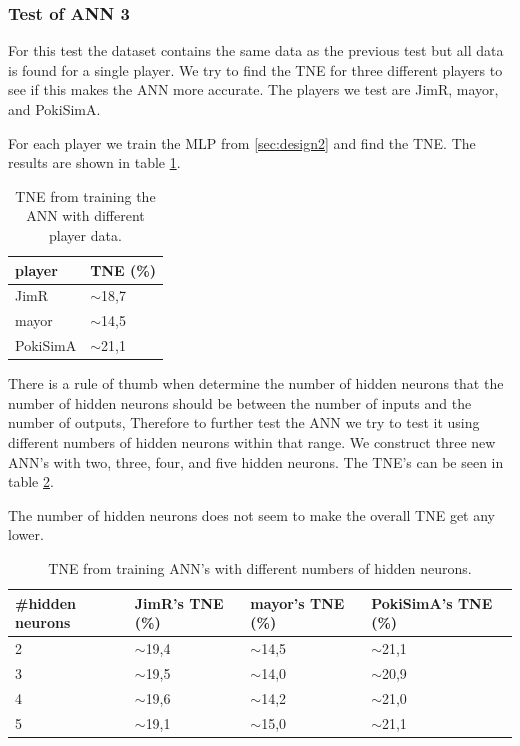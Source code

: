 \subsubsection{Test of ANN 3}
\label{sec:ann-test3}
For this test the dataset contains the same data as the previous test but all data is found for a single player. We try to find the TNE for three different players to see if this makes the ANN more accurate. The players we test are JimR, mayor, and PokiSimA.

For each player we train the MLP from \ref{sec:design2} and find the TNE. The results are shown in table \ref{tab:tneg3}.

\vspace{4mm}
\begin{table}[H]
\center
\begin{tabular}{ | l | l |}
  \hline
  player & TNE (\%) \\
  \hline
  JimR & $\sim$18,7 \\
  mayor & $\sim$14,5 \\
  PokiSimA & $\sim$21,1 \\
  \hline
\end{tabular}
\caption{TNE from training the ANN with different player data.\label{tab:tneg3}}
\end{table}
\vspace{4mm}

There is a rule of thumb when determine the number of hidden neurons that the number of hidden neurons should be between the number of inputs and the number of outputs,
Therefore to further test the ANN we try to test it using different numbers of hidden neurons within that range. We construct three new ANN's with two, three, four, and five hidden neurons. The TNE's can be seen in table \ref{tab:tneg4}. 

The number of hidden neurons does not seem to make the overall TNE get any lower.

\vspace{4mm}
\begin{table}[H]
\center
\begin{tabular}{ | l | l | l | l | }
  \hline
  \#hidden neurons & JimR's TNE (\%) & mayor's TNE (\%) & PokiSimA's TNE (\%) \\
  \hline
  2 & $\sim$19,4 & $\sim$14,5 & $\sim$21,1 \\
  3 & $\sim$19,5 & $\sim$14,0 & $\sim$20,9 \\
  4 & $\sim$19,6 & $\sim$14,2 & $\sim$21,0 \\
  5 & $\sim$19,1 & $\sim$15,0 & $\sim$21,1 \\
  \hline
\end{tabular}
\caption{TNE from training ANN's with different numbers of hidden neurons.\label{tab:tneg4}}
\end{table}
\vspace{4mm}

